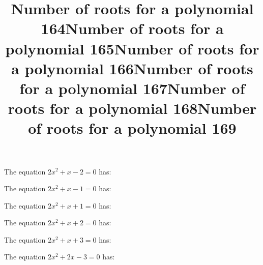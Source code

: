 \documentclass{article}
\begin{document}
\begin{category}
\begin{question}[multichoice]


\end{question}
\begin{question}[multichoice]
\title{Number of roots for a polynomial 164}
The equation $2 x^{2} + x - 2=0$ has:



\end{question}
\begin{question}[multichoice]
\title{Number of roots for a polynomial 165}
The equation $2 x^{2} + x - 1=0$ has:



\end{question}
\begin{question}[multichoice]
\title{Number of roots for a polynomial 166}
The equation $2 x^{2} + x + 1=0$ has:



\end{question}
\begin{question}[multichoice]
\title{Number of roots for a polynomial 167}
The equation $2 x^{2} + x + 2=0$ has:



\end{question}
\begin{question}[multichoice]
\title{Number of roots for a polynomial 168}
The equation $2 x^{2} + x + 3=0$ has:



\end{question}
\begin{question}[multichoice]
\title{Number of roots for a polynomial 169}
The equation $2 x^{2} + 2 x - 3=0$ has:




\end{question}
\end{category}
\end{document}
